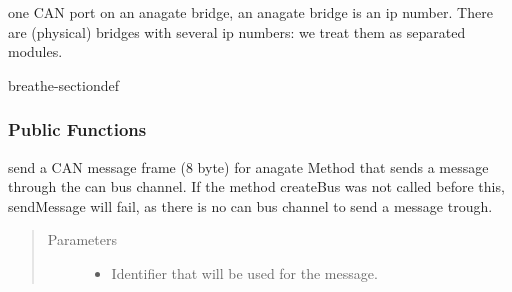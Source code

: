 \documentclass[a4paper,10pt,english]{sphinxmanual}
\begin{document}
\begin{fulllineitems}
\label{\detokenize{classestracing:_CPPv410AnaCanScan}}%
\pysigstartmultiline
{}%
\pysigstopmultiline
\sphinxAtStartPar
one CAN port on an anagate bridge, an anagate bridge is an ip number. There are (physical) bridges with several ip numbers: we treat them as separated modules. 

\begin{sphinxuseclass}{breathe-sectiondef}\subsubsection*{Public Functions}

\begin{fulllineitems}
\label{\detokenize{classestracing:_CPPv4N10AnaCanScan11sendMessageEshPhb}}%
\pysigstartmultiline
{}%
\pysigstopmultiline
\sphinxAtStartPar
send a CAN message frame (8 byte) for anagate Method that sends a message through the can bus channel. If the method createBus was not called before this, sendMessage will fail, as there is no can bus channel to send a message trough. 
\begin{quote}\begin{description}
\item[{Parameters}] \leavevmode\begin{itemize}
\item {} 
\sphinxAtStartPar
{} \textendash{} Identifier that will be used for the message. 


\end{itemize}
\end{description}
\end{quote}
\end{fulllineitems}
\end{sphinxuseclass}
\end{fulllineitems}
\end{document}
